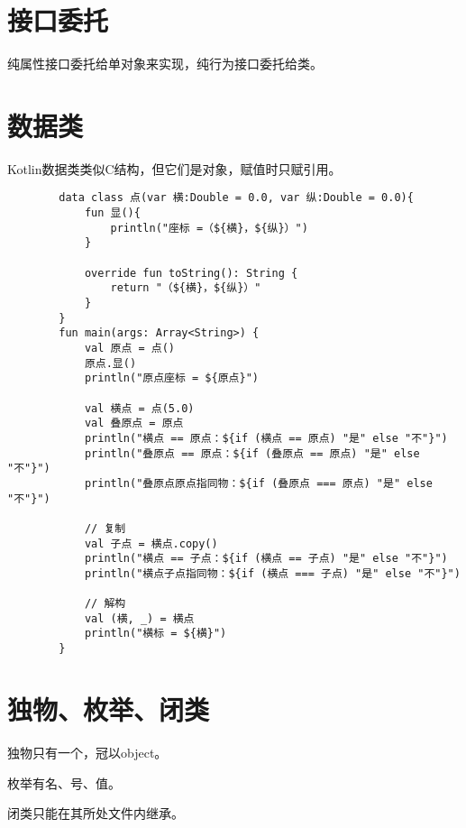 \section{接口委托}
纯属性接口委托给单对象来实现，纯行为接口委托给类。

\section{数据类}
Kotlin数据类类似C结构，但它们是对象，赋值时只赋引用。

    \begin{verbatim}
        data class 点(var 横:Double = 0.0, var 纵:Double = 0.0){
            fun 显(){
                println("座标 =（${横}，${纵}）")
            }
        
            override fun toString(): String {
                return "（${横}，${纵}）"
            }
        }
        fun main(args: Array<String>) {
            val 原点 = 点()
            原点.显()
            println("原点座标 = ${原点}")
        
            val 横点 = 点(5.0)
            val 叠原点 = 原点
            println("横点 == 原点：${if (横点 == 原点) "是" else "不"}")
            println("叠原点 == 原点：${if (叠原点 == 原点) "是" else "不"}")
            println("叠原点原点指同物：${if (叠原点 === 原点) "是" else "不"}")
        
            // 复制
            val 子点 = 横点.copy()
            println("横点 == 子点：${if (横点 == 子点) "是" else "不"}")
            println("横点子点指同物：${if (横点 === 子点) "是" else "不"}")
        
            // 解构
            val (横, _) = 横点
            println("横标 = ${横}")
        }        
    \end{verbatim}

\section{独物、枚举、闭类}
独物只有一个，冠以object。

枚举有名、号、值。

闭类只能在其所处文件内继承。

